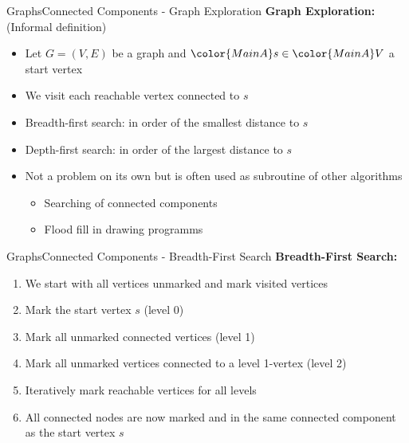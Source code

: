 
\begin{frame}{Graphs}{Connected Components - Graph Exploration}
  \textbf{Graph Exploration:} (Informal definition)
  \begin{itemize}
    \item<2->
      Let {\color{MainA}$G = (V , E)$} be a graph and
      ${\color{MainA}s} \in {\color{MainA}V}$ a start vertex
    \item<3->
      We visit each reachable vertex connected to {\color{MainA}$s$}
    \item<4->
      {\color{MainA}Breadth-first search}: in order of the
      smallest distance to {\color{MainA}$s$}
    \item<5->
      {\color{MainA}Depth-first search}: in order of the
      largest distance to {\color{MainA}$s$}
    \item<6->
      Not a problem on its own but is often used as subroutine of other algorithms
      \begin{itemize}
        \item<7->
          Searching of connected components
        \item<8->
          Flood fill in drawing programms
      \end{itemize}
  \end{itemize}
\end{frame}


\begin{frame}{Graphs}{Connected Components - Breadth-First Search}
  \textbf{Breadth-First Search:}
  \begin{enumerate}
    \item
      We start with all vertices unmarked and
      {\color{MainA}mark visited vertices}
    \item<2->
      Mark the start vertex {\color{MainA}$s$}
      ({\color{MainA}level 0})
    \item<3->
      Mark all unmarked {\color{MainA}connected vertices}
      ({\color{MainA}level 1})
    \item<4->
      Mark all unmarked {\color{MainA}vertices connected} to a
      {\color{MainA}level 1}-vertex
      ({\color{MainA}level 2})
    \item<5->
      Iteratively mark reachable vertices for all levels
    \item<6->
      All connected nodes are now marked and in the same
      {\color{MainA}connected component} as the start vertex
      {\color{MainA}$s$}
  \end{enumerate}
\end{frame}

